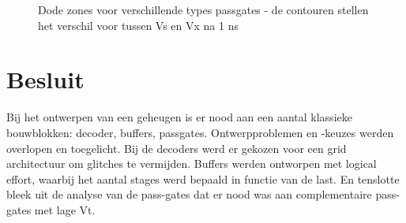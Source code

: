 \begin{figure}[!ht]
\caption[Dode zones voor verschillende types passgates]{Dode zones voor verschillende types passgates - de contouren stellen het verschil voor tussen Vs en Vx na 1 ns}
\label{fig:passgate3}
\end{figure}



\section{Besluit}
Bij het ontwerpen van een geheugen is er nood aan een aantal klassieke bouwblokken: decoder, buffers, passgates. Ontwerpproblemen en -keuzes werden overlopen en toegelicht. Bij de decoders werd er gekozen voor een grid architectuur om glitches te vermijden. Buffers werden ontworpen met logical effort, waarbij het aantal stages werd bepaald in functie van de last. En tenslotte bleek uit de analyse van de pass-gates dat er nood was aan complementaire pass-gates met lage Vt.
